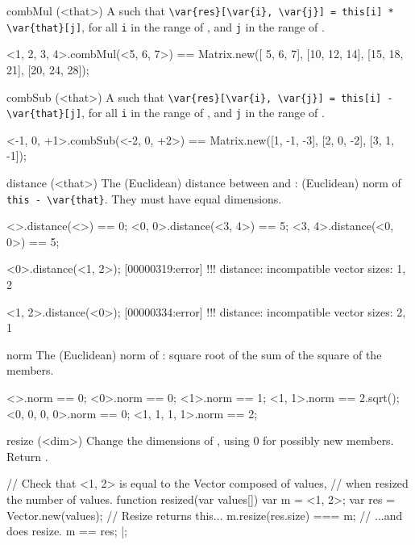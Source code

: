 \begin{urbiscriptapi}
\item[combMul](<that>)%
  A   such that
  \lstinline|\var{res}[\var{i}, \var{j}] = this[i] * \var{that}[j]|, for all
  \lstinline|i| in the range of \this, and \lstinline|j| in the range of
  \that.
\begin{urbiassert}
<1, 2, 3, 4>.combMul(<5, 6, 7>)
  == Matrix.new([ 5,  6,  7],
                [10, 12, 14],
                [15, 18, 21],
                [20, 24, 28]);
\end{urbiassert}


\item[combSub](<that>)%
  A   such that
  \lstinline|\var{res}[\var{i}, \var{j}] = this[i] - \var{that}[j]|, for all
  \lstinline|i| in the range of \this, and \lstinline|j| in the range of
  \that.
\begin{urbiassert}
<-1, 0, +1>.combSub(<-2, 0, +2>)
  == Matrix.new([1, -1, -3],
                [2,  0, -2],
                [3,  1, -1]);
\end{urbiassert}


\item[distance](<that>)%
  The (Euclidean) distance between \this and \that: (Euclidean) norm of
  \lstinline|this - \var{that}|.  They must have equal dimensions.
\begin{urbiassert}
  <>.distance(<>) == 0;
  <0, 0>.distance(<3, 4>) == 5;
  <3, 4>.distance(<0, 0>) == 5;
\end{urbiassert}

\begin{urbiscript}
<0>.distance(<1, 2>);
[00000319:error] !!! distance: incompatible vector sizes: 1, 2

<1, 2>.distance(<0>);
[00000334:error] !!! distance: incompatible vector sizes: 2, 1
\end{urbiscript}


\item[norm]%
  The (Euclidean) norm of \this: square root of the sum of the square of the
  members.
\begin{urbiassert}
 <>.norm == 0;
 <0>.norm == 0;
 <1>.norm == 1;
 <1, 1>.norm == 2.sqrt();
 <0, 0, 0, 0>.norm == 0;
 <1, 1, 1, 1>.norm == 2;
\end{urbiassert}

\item[resize](<dim>)%
  Change the dimensions of \this, using 0 for possibly new members.  Return
  \this.
\begin{urbiscript}
// Check that <1, 2> is equal to the Vector composed of values,
// when resized the number of values.
function resized(var values[])
{
  var m = <1, 2>;
  var res = Vector.new(values);
  // Resize returns this...
  m.resize(res.size) === m;
  // ...and does resize.
  m == res;
}|;


\end{urbiscript}
\end{urbiscriptapi}
